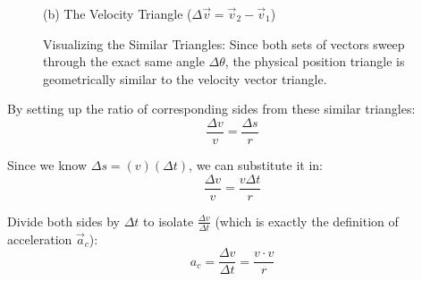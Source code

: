 \documentclass{article}
\begin{document}
\begin{figure}[h]
\begin{minipage}{0.45\textwidth}
        
        \vspace{0.2cm}
        \small (b) The Velocity Triangle ($\Delta \vec{v} = \vec{v}_2 - \vec{v}_1$)
    \end{minipage}
    \caption{Visualizing the Similar Triangles: Since both sets of vectors sweep through the exact same angle $\Delta \theta$, the physical position triangle is geometrically similar to the velocity vector triangle.}
\end{figure}

By setting up the ratio of corresponding sides from these similar triangles:
\begin{equation}
    \frac{\Delta v}{v} = \frac{\Delta s}{r}
\end{equation}

Since we know $\Delta s = (v)(\Delta t)$, we can substitute it in:
\begin{equation*}
    \frac{\Delta v}{v} = \frac{v \Delta t}{r}
\end{equation*}

Divide both sides by $\Delta t$ to isolate $\frac{\Delta v}{\Delta t}$ (which is exactly the definition of acceleration $\vec{a}_c$):
\begin{equation*}
    a_c = \frac{\Delta v}{\Delta t} = \frac{v \cdot v}{r}
\end{equation*}
\end{document}

